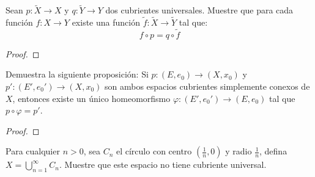 \documentclass[12pt]{report}
\theoremstyle{largebreak}
\newcommand\cf[3]{\ensuremath{#1:#2\rightarrow#3}}
\begin{document}
    \begin{excer}
        Sean $\cf{p}{\widetilde{X}}{X}$ y $\cf{q}{\widetilde{Y}}{Y}$ dos cubrientes universales. Muestre que para cada función $\cf{f}{X}{Y}$ existe una función $\cf{\widetilde{f}}{\widetilde{X}}{\widetilde{Y}}$ tal que:
        \begin{equation*}
            f\circ p=q\circ\widetilde{f}
        \end{equation*}
    \end{excer}

    \begin{proof}
        
    \end{proof}

    \begin{excer}
        Demuestra la siguiente proposición: Si $\cf{p}{(E,e_0)}{(X,x_0)}$ y $\cf{p'}{(E',e_0')}{(X,x_0)}$ son ambos espacios cubrientes simplemente conexos de $X$, entonces existe un único homeomorfismo $\cf{\varphi}{(E',e_0')}{(E,e_0)}$ tal que $p\circ\varphi=p'$.
    \end{excer}

    \begin{proof}
        
    \end{proof}

    \begin{excer}
        Para cualquier $n>0$, sea $C_n$ el círculo con centro $\left(\frac{1}{n},0\right)$ y radio $\frac{1}{n}$, defina $X=\bigcup_{ n=1}^\infty C_n$. Muestre que este espacio no tiene cubriente universal.
    \end{excer}
\end{document}
